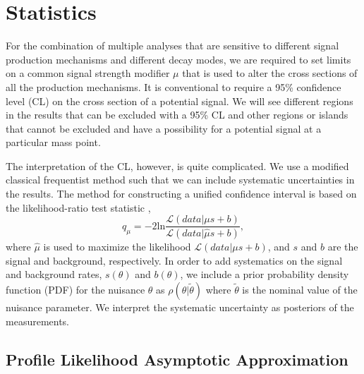 \section{Statistics}\label{sec:Statistics}

For the combination of multiple analyses that are sensitive to different signal production mechanisms and different decay modes, we are required to set limits on a common signal strength modifier $\mu$ that is used to alter the cross sections of all the production mechanisms. It is conventional to require a 95\% confidence level (CL) on the cross section of a potential signal. We will see different regions in the results that can be excluded with a 95\% CL and other regions or islands that cannot be excluded and have a possibility for a potential signal at a particular mass point. 

The interpretation of the CL, however, is quite complicated. We use a modified classical frequentist method such that we can include systematic uncertainties in the results. The method for constructing a unified confidence interval is based on the likelihood-ratio test statistic \cite{feldman_unified_1998}, 
\begin{equation}\label{eqn:likelihoodtest}
q_\mu=-2\text{ln}\frac{\mathcal{L}(data|\mu s+b)}{\mathcal{L}(data|\hat{\mu} s+b)},
\end{equation}
where $\hat{\mu}$ is used to maximize the likelihood $\mathcal{L}(data|\mu s+b)$, and $s$ and $b$ are the signal and background, respectively. In order to add systematics on the signal and background rates, $s(\theta)$ and $b(\theta)$, we include a prior probability density function (PDF) for the nuisance $\theta$ as $\rho(\theta|\widetilde{\theta})$ where $\widetilde{\theta}$ is the nominal value of the nuisance parameter. We interpret the systematic uncertainty as posteriors of the measurements.

\subsection{Profile Likelihood Asymptotic Approximation}\label{subsec:Asymptotic}


